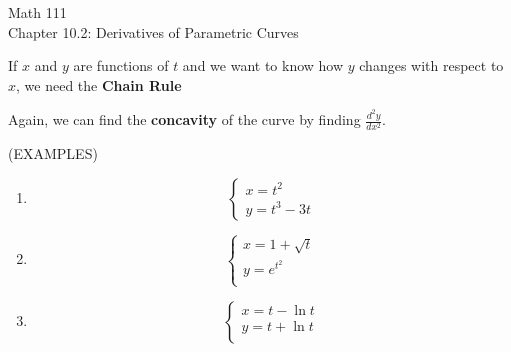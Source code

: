 \documentclass[11pt]{article}
\begin{document}
\begin{center}
\Large
\rm{Math 111}
\\
\rm{Chapter 10.2:  Derivatives of Parametric Curves}
\\
\end{center}
\vspace{0.2in}

If $x$ and $y$ are functions of $t$ and we want to know how $y$ changes with respect to $x$, we need the {\bf Chain Rule}



\vspace{1in}

Again, we can find the {\bf concavity}  of the curve by finding $\frac{d^2y}{dx^2}$.

\vspace{2in}

(EXAMPLES)


\begin{enumerate}
\item{
  \begin{displaymath}
  \left\{ \begin{array}{ll}
    x = t^2 \\
    y = t^3-3t
\end{array} \right.
\end{displaymath}
}

\pagebreak

\item{
  \begin{displaymath}
  \left\{ \begin{array}{ll}
    x = 1+\sqrt{t} \\
    y = e^{t^2}\\
\end{array} \right.
  \end{displaymath}
   \vspace{0.1in}
}

  \vspace{3in}
  
  \item{
  \begin{displaymath}
  \left\{ \begin{array}{ll}
    x = t-\ln{t} \\
    y = t+\ln{t} \\
\end{array} \right.
  \end{displaymath}
     \vspace{0.1in}

}


\end{enumerate}
\end{document}
